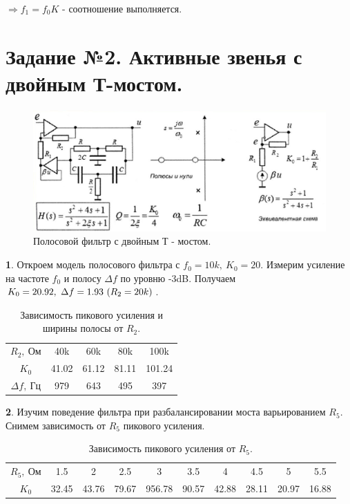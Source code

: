 \documentclass[a4paper, 12pt, twoside]{article}
\newcommand*{\hm}[1]{#1\nobreak\discretionary{}
	{\hbox{$\mathsurround=0pt #1$}}{}}
\begin{document}
$\Longrightarrow f_1 = f_0K$ - соотношение выполняется.



\newpage
\section*{Задание №2. Активные звенья с двойным Т-мостом.}
\begin{figure}[H]
	\centering
	\includegraphics[width =  0.9\linewidth]{pfiltr}
	\caption{Полосовой фильтр с двойным Т - мостом.}
	\label{nus}
\end{figure}


\textbf{1}. Откроем модель полосового фильтра  с $f_0 = 10k,~ K_0 = 20$. Измерим усиление на частоте $f_0$ и полосу $\Delta f$ по уровню -3dB. Получаем $K_0 = 20.92,~\Delta f \hm{=} 1.93~(R_2 = 20k)$.

\begin{table}[H]
	\centering
	\caption{Зависимость пикового усиления и ширины полосы от $R_2$.}
	
	\begin{tabular}{c|cccc} \toprule
		$R_2,~\text{Ом}$      & 40k   & 60k   & 80k   & 100k   \\
		$K_0$      & 41.02 & 61.12 & 81.11 & 101.24 \\
		$\Delta f,~\text{Гц}$ & 979   & 643   & 495   & 397   \\ \bottomrule
	\end{tabular}
\end{table}

\textbf{2}.  Изучим поведение фильтра при разбалансировании моста варьированием $R_5$. Снимем зависимость от $R_5$ пикового усиления.

\begin{table}[H]
	\centering
	\caption{Зависимость пикового усиления от $R_5$.}
	
	\begin{tabular}{c|ccccccccc} \toprule
		$R_5,~\text{Ом}$ & 1.5   & 2     & 2.5   & 3      & 3.5   & 4     & 4.5   & 5     & 5.5   \\
		$K_0$            & 32.45 & 43.76 & 79.67 & 956.78 & 90.57 & 42.88 & 28.11 & 20.97 & 16.88 \\ \bottomrule
	\end{tabular}
\end{table}
\end{document}
